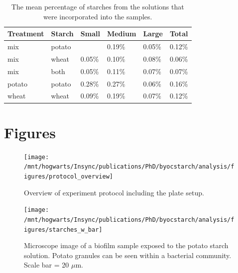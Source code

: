 \documentclass[utf8]{frontiers/frontiersSCNS}
\begin{document}
\begin{table}

\caption{\label{tab:sample-prop-tbl}The mean percentage of starches from the solutions that 
              were incorporated into the samples.}
\centering
\begin{tabular}[t]{l|l|l|l|l|l}
\hline
Treatment & Starch & Small & Medium & Large & Total\\
\hline
mix & potato &  & 0.19\% & 0.05\% & 0.12\%\\
\hline
mix & wheat & 0.05\% & 0.10\% & 0.08\% & 0.06\%\\
\hline
mix & both & 0.05\% & 0.11\% & 0.07\% & 0.07\%\\
\hline
potato & potato & 0.28\% & 0.27\% & 0.06\% & 0.16\%\\
\hline
wheat & wheat & 0.09\% & 0.19\% & 0.07\% & 0.12\%\\
\hline
\end{tabular}
\end{table}

\hypertarget{figures}{%
\section*{Figures}\label{figures}}

\begin{figure}[H]

{\centering \texttt{[image: /mnt/hogwarts/Insync/publications/PhD/byocstarch/analysis/figures/protocol\_overview]} 

}

\caption{Overview of experiment protocol including the plate setup.}\label{fig:protocol-fig}
\end{figure}

\begin{figure}[H]

{\centering \texttt{[image: /mnt/hogwarts/Insync/publications/PhD/byocstarch/analysis/figures/starches\_w\_bar]} 

}

\caption{Microscope image of a biofilm sample exposed to the potato starch solution. Potato granules can be seen within a bacterial community. Scale bar = 20 $\mu$m.}\label{fig:microscope-fig}
\end{figure}
\end{document}
